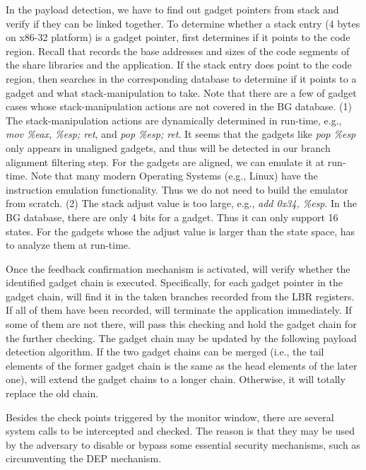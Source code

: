 In the payload detection, we have to find out gadget pointers from stack and verify if they can be linked together.
To determine whether a stack entry (4 bytes on x86-32 platform) is a gadget pointer,
\name first determines if it points to the code region. Recall that \name records
the base addresses and sizes of the code segments of the share libraries and the application.
If the stack entry does point to the code region,
\name then searches in the corresponding database to determine if it points to a
gadget and what stack-manipulation to take. Note that there are a few of gadget cases
whose stack-manipulation actions are not covered in the BG database.
(1) The stack-manipulation actions are dynamically determined in run-time, e.g.,
\emph{mov \%eax, \%esp; ret}, and \emph{pop \%esp; ret}. It seems that the gadgets like \emph{pop \%esp} only appears in unaligned gadgets,
and thus will be detected in our branch alignment filtering step.
For the gadgets are aligned, we can emulate it at run-time. Note that many modern Operating Systems (e.g., Linux) have the instruction emulation functionality. Thus we do not need to build the emulator from scratch.
(2) The stack adjust value is too large, e.g., \emph{add 0x34, \%esp}. In the BG database, there are only 4 bits for a gadget. Thus it can only support 16 states. For the gadgets whose the adjust value is larger than the state space, \name has to analyze them at run-time.


Once the feedback confirmation mechanism is activated, \name will verify whether the identified gadget chain is executed.
Specifically, for each gadget pointer in the gadget chain, \name will find it in the taken branches recorded from the LBR registers.
If all of them have been recorded, \name will terminate the application immediately.
If some of them are not there, \name will pass this checking and hold the gadget chain for the further checking.
The gadget chain may be updated by the following payload detection algorithm. If the two gadget chains can be merged (i.e., the tail elements of the former gadget chain is the same as the head elements of the later one), \name will extend the gadget chains to a longer chain. Otherwise, it will totally replace the old chain.




Besides the check points triggered by the monitor window, there are several system calls to be intercepted and checked. The reason is that they may be used by the adversary to disable or bypass some essential security mechanisms, such as circumventing the DEP mechanism.

